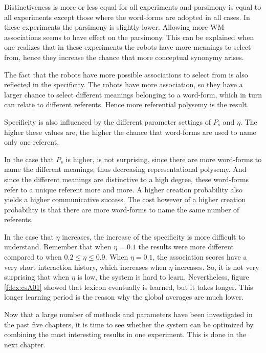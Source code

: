 Distinctiveness is more or less equal for all experiments and parsimony is equal to all experiments except those where the word-forms are adopted in all cases. In these experiments the parsimony is slightly lower. Allowing more WM associations seems to have effect on the parsimony. This can be explained when one realizes that in these experiments the robots have more meanings to select from, hence they increase the chance that more conceptual synonymy arises.

The fact that the robots have more possible associations to select from is also reflected in the specificity. The robots have more association, so they have a larger chance to select different meanings belonging to a word-form, which in turn can relate to different referents. Hence more referential polysemy is the result.

Specificity is also influenced by the different parameter settings of $P_s$ and $\eta$. The higher these values are, the higher the chance that word-forms are used to name only one referent. 

In the case that $P_s$ is higher, is not surprising, since there are more word-forms to name the different meanings, thus decreasing representational polysemy. And since the different meanings are distinctive to a high degree, these word-forms refer to a unique referent more and more. A higher creation probability also yields a higher communicative success. The cost however of a higher creation probability is that there are more word-forms to name the same number of referents.

In the case that $\eta$ increases, the increase of the specificity is more difficult to understand. Remember that when $\eta=0.1$ the results were more different compared to when $0.2 \leq \eta \leq 0.9$. When $\eta=0.1$, the association scores have a very short interaction history, which increases when $\eta$ increases. So, it is not very surprising that when $\eta$ is low, the system is hard to learn. Nevertheless, figure \ref{f:lex:csA01} showed that lexicon eventually is learned, but it takes longer. This longer learning period is the reason why the global averages are much lower.

\p
Now that a large number of methods and parameters have been investigated in the past five chapters, it is time to see whether the system can be optimized by combining the most interesting results in one experiment. This is done in the next chapter.